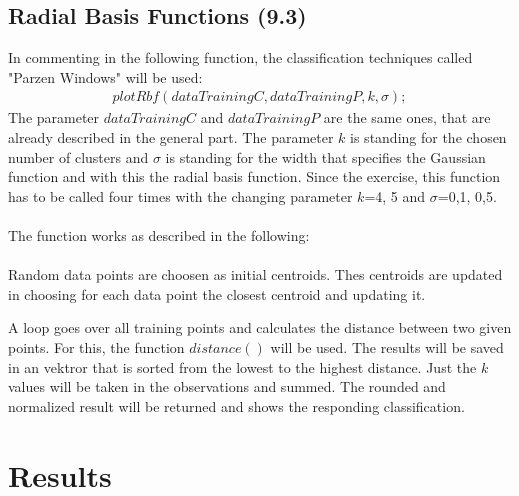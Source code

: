 \documentclass[a4paper,headings=small]{scrartcl}
\begin{document}
\subsection{Radial Basis Functions (9.3)}
In commenting in the following function, the classification techniques called "Parzen Windows" will be used:\\
\begin{align}
plotRbf(dataTrainingC, dataTrainingP, k, \sigma);
\end{align}
The parameter $dataTrainingC$ and $dataTrainingP$ are the same ones, that are already described in the general part. The parameter $k$ is standing for the chosen number of clusters and $\sigma$ is standing for the width that specifies the Gaussian function and with this the radial basis function.
Since the exercise, this function has to be called four times with the changing parameter $k$=4, 5 and $\sigma$=0,1, 0,5.\\
\\
The function works as described in the following:\\
\\
Random data points are choosen as initial centroids. Thes centroids are updated in choosing for each data point the closest centroid and updating it.

A loop goes over all training points and calculates the distance between two given points. For this, the function $distance()$ will be used. The results will be saved in an vektror that is sorted from the lowest to the highest distance. Just the $k$ values will be taken in the observations and summed. The rounded and normalized result will be returned and shows the responding classification.

\section{Results}
\end{document}
